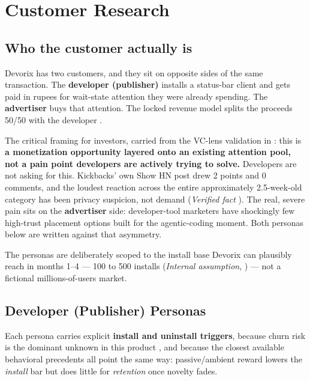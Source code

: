 \chapter{Customer Research}
\label{chap:customer-research}

\section{Who the customer actually is}
\label{sec:who-customer-is}

Devorix has two customers, and they sit on opposite sides of the same transaction. The \textbf{developer (publisher)} installs a status-bar client and gets paid in rupees for wait-state attention they were already spending. The \textbf{advertiser} buys that attention. The locked revenue model splits the proceeds 50/50 with the developer \cite{masterplan_2026}.

The critical framing for investors, carried from the VC-lens validation in \cite{masterplan_2026}: this is \textbf{a monetization opportunity layered onto an existing attention pool, not a pain point developers are actively trying to solve.} Developers are not asking for this. Kickbacks' own Show HN post drew 2 points and 0 comments, and the loudest reaction across the entire approximately 2.5-week-old category has been privacy suspicion, not demand (\emph{Verified fact} \cite{masterplan_2026,kickbacks_showhn_2026}). The real, severe pain sits on the \textbf{advertiser} side: developer-tool marketers have shockingly few high-trust placement options built for the agentic-coding moment. Both personas below are written against that asymmetry.

The personas are deliberately scoped to the install base Devorix can plausibly reach in months 1--4 --- 100 to 500 installs (\emph{Internal assumption}, \cite{masterplan_2026}) --- not a fictional millions-of-users market.

\section{Developer (Publisher) Personas}
\label{sec:developer-personas}

Each persona carries explicit \textbf{install and uninstall triggers}, because churn risk is the dominant unknown in this product \cite{masterplan_2026}, and because the closest available behavioral precedents all point the same way: passive/ambient reward lowers the \emph{install} bar but does little for \emph{retention} once novelty fades.

